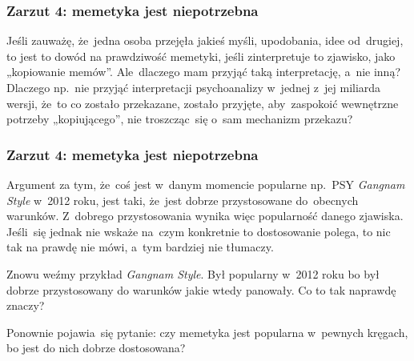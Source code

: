 \documentclass[10pt,t]{beamer}
\begin{document}
\begin{frame}
  \frametitle{Zarzut 4: memetyka jest niepotrzebna}


  Jeśli zauważę, że~jedna osoba przejęła jakieś myśli,
  upodobania, idee od~drugiej, to jest to dowód na prawdziwość
  memetyki, jeśli zinterpretuje to zjawisko, jako „kopiowanie
  memów”. Ale~dlaczego mam przyjąć taką interpretację, a~nie
  inną? Dlaczego np.~nie przyjąć interpretacji psychoanalizy
  w~jednej z~jej miliarda wersji, że~to co zostało przekazane,
  zostało przyjęte, aby~zaspokoić wewnętrzne potrzeby
  „kopiującego”, nie troszcząc~się o~sam mechanizm przekazu?


\end{frame}





\begin{frame}
  \frametitle{Zarzut 4: memetyka jest niepotrzebna}


  Argument za tym, że~coś jest w~danym momencie popularne
  np.~PSY \textit{Gangnam Style} w~2012 roku, jest taki, że~jest dobrze
  przystosowane do~obecnych warunków. Z~dobrego przystosowania wynika więc
  popularność danego zjawiska. Jeśli~się jednak nie wskaże na~czym
  konkretnie to dostosowanie polega, to nic tak na prawdę nie mówi, a~tym
  bardziej nie tłumaczy.

  Znowu weźmy przykład \textit{Gangnam Style}. Był popularny w~2012 roku bo
  był dobrze przystosowany do warunków jakie wtedy panowały. Co to tak
  naprawdę znaczy?

  Ponownie pojawia~się pytanie: czy memetyka jest popularna
  w~pewnych kręgach, bo jest do nich dobrze dostosowana?

\end{frame}
\end{document}
